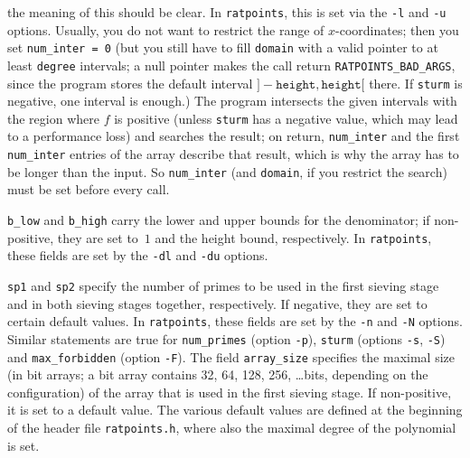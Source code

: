 \documentclass[12pt,a4paper,oneside]{amsart}
\begin{document}
the meaning of this should be clear. In \texttt{ratpoints}, this is set
via the \verb+-l+ and \verb+-u+ options. Usually, you do not want to
restrict the range of $x$-coordinates; then you set \texttt{num\_inter = 0}
(but you still have to fill \texttt{domain} with a valid pointer to at least
\texttt{degree} intervals; a null pointer makes the call return
\texttt{RATPOINTS\_BAD\_ARGS}, since the program stores the default
interval $]-\texttt{height}, \texttt{height}[$ there. If \texttt{sturm} is
negative, one interval is enough.)
The program intersects the given intervals with the region where $f$ is
positive (unless \texttt{sturm} has a negative value, which may lead to a
performance loss) and searches the result; on return, \texttt{num\_inter}
and the first \texttt{num\_inter} entries of the array describe that
result, which is why the array has to be longer than the input. So
\texttt{num\_inter} (and \texttt{domain}, if you restrict the search) must
be set before every call.

\texttt{b\_low} and \texttt{b\_high}
carry the lower and upper bounds for the denominator; if non-positive, they are
set to~$1$ and the height bound, respectively. In \texttt{ratpoints}, these
fields are set by the \verb+-dl+ and \verb+-du+ options.

\texttt{sp1} and \texttt{sp2}
specify the number of primes to be used in the first sieving stage and
in both sieving stages together, respectively. If negative, they are set
to certain default values. In \texttt{ratpoints}, these fields are set by the
\verb+-n+ and \verb+-N+ options. Similar statements are true for
\texttt{num\_primes} (option \verb+-p+), \texttt{sturm} (options \verb+-s+,
\verb+-S+) and \texttt{max\_forbidden} (option \verb+-F+). The field
\texttt{array\_size} specifies the maximal size (in bit arrays; a bit array
contains 32, 64, 128, 256, \dots bits, depending on the configuration) of the
array that is used in the first sieving stage. If non-positive, it is
set to a default value. The various default values are defined at the
beginning of the header file \texttt{ratpoints.h}, where also the maximal
degree of the polynomial is set.
\end{document}
